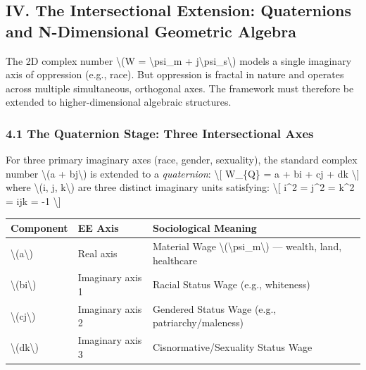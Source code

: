 {\protect{}\label{sec-intersectional}
\subsection{IV. The Intersectional Extension: Quaternions and
N-Dimensional Geometric
Algebra}\label{iv.-the-intersectional-extension-quaternions-and-n-dimensional-geometric-algebra}

The 2D complex number \textbackslash(W = \textbackslash psi\_m +
j\textbackslash psi\_s\textbackslash) models a single imaginary axis of
oppression (e.g., race). But oppression is fractal in nature and
operates across multiple simultaneous, orthogonal axes. The framework
must therefore be extended to higher-dimensional algebraic structures.

\subsubsection{4.1 The Quaternion Stage: Three Intersectional
Axes}\label{the-quaternion-stage-three-intersectional-axes}

For three primary imaginary axes (race, gender, sexuality), the standard
complex number \textbackslash(a + bj\textbackslash) is extended to a
\emph{quaternion}: \textbackslash{[} W\_\{Q\} = a + bi + cj + dk
\textbackslash{]} where \textbackslash(i, j, k\textbackslash) are three
distinct imaginary units satisfying: \textbackslash{[} i\^{}2 = j\^{}2 =
k\^{}2 = ijk = -1 \textbackslash{]}

{\def\LTcaptype{none} %
\begin{longtable}[]{@{}lll@{}}
\toprule\noalign{}
Component & EE Axis & Sociological Meaning \\
\midrule\noalign{}
\endhead
\bottomrule\noalign{}
\endlastfoot
\textbackslash(a\textbackslash) & Real axis & Material Wage
\textbackslash(\textbackslash psi\_m\textbackslash) --- wealth, land,
healthcare \\
\textbackslash(bi\textbackslash) & Imaginary axis 1 & Racial Status Wage
(e.g., whiteness) \\
\textbackslash(cj\textbackslash) & Imaginary axis 2 & Gendered Status
Wage (e.g., patriarchy/maleness) \\
\textbackslash(dk\textbackslash) & Imaginary axis 3 &
Cisnormative/Sexuality Status Wage \\
\end{longtable}
}

}
